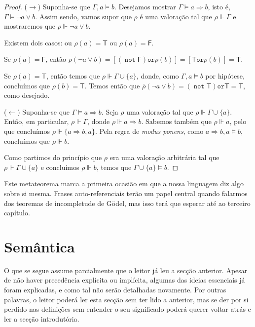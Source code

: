\documentclass{report}
\theoremstyle{definition}
\theoremstyle{remark}
\newcommand{\lt}{\mathsf{T}}
\newcommand{\lf}{\mathsf{F}}
\DeclareMathOperator{\pnot}{\texttt{not}}
\newcommand{\por}{\mathbin{\texttt{or}}}
\newcommand{\imply}{\mathbin{\Rightarrow}}
\begin{document}
	\begin{proof}\label{dem:mtd}
	($\rightarrow$) Suponha-se que $\Gamma, a \vDash b$. Desejamos mostrar $\Gamma \vDash a \imply b$, isto é, $\Gamma \vDash \neg a \lor b$. Assim sendo, vamos supor que $\rho$ é uma valoração tal que $\rho \Vdash \Gamma$ e mostraremos que $\rho \Vdash \neg a \lor b$.
	
	Existem dois casos: ou $\rho(a) = \lt$ ou $\rho(a) = \lf$.
	
	Se $\rho(a) = \lf$, então $\overline\rho(\neg a \lor b) = [(\pnot \lf) \por \rho(b)] = [\lt \por \rho(b)] = \lt$.
	
	Se $\rho(a) = \lt$, então temos que $\rho \Vdash \Gamma \cup \{a\}$, donde, como $\Gamma, a \vDash b$ por hipótese, concluímos que $\rho(b) = \lt$. Temos então que $\overline\rho(\neg a \lor b) = (\pnot \lt) \por \lt = \lt$, como desejado.
	
	($\leftarrow$) Suponha-se que $\Gamma \vDash a \imply b$. Seja $\rho$ uma valoração tal que $\rho \Vdash \Gamma \cup \{a\}$. Então, em particular, $\rho \Vdash \Gamma$, donde $\rho \Vdash a \imply b$. Sabemos também que $\rho \Vdash a$, pelo que concluímos $\rho \Vdash \{a \imply b, a\}$. Pela regra de \textit{modus ponens}, como $a \imply b, a \vDash b$, concluímos que $\rho \Vdash b$.
	
	Como partimos do princípio que $\rho$ era uma valoração arbitrária tal que $\rho \Vdash \Gamma \cup \{a\}$ e concluímos $\rho \Vdash b$, temos que $\Gamma \cup \{a\} \vDash b$.
	\end{proof}
	
	Este metateorema marca a primeira ocasião em que a nossa linguagem diz algo sobre si mesma. Frases auto-referenciais terão um papel central quando falarmos dos teoremas de incompletude de Gödel, mas isso terá que esperar até ao terceiro capítulo.
	
	\section{Semântica}
	
	O que se segue assume parcialmente que o leitor já leu a secção anterior. Apesar de não haver precedência explícita ou implícita, algumas das ideias essenciais já foram explicadas, e como tal não serão detalhadas novamente. Por outras palavras, o leitor poderá ler esta secção sem ter lido a anterior, mas se der por si perdido nas definições sem entender o seu significado poderá querer voltar atrás e ler a secção introdutória.
	
\end{document}
